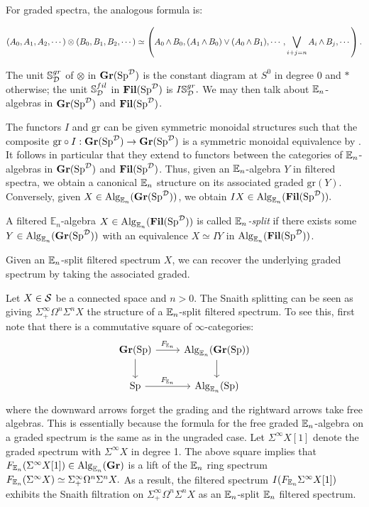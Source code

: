 For graded spectra, the analogous formula is:

$$(A_0,A_1,A_2,\cdots) \otimes (B_0,B_1,B_2,\cdots) \simeq \left( A_0 \smsh B_0, (A_1 \smsh B_0) \vee (A_0 \smsh B_1), \cdots, \bigvee_{i+j=n} A_i \smsh B_j, \cdots \right).$$


The unit $\mathbb{S}^{gr}_{\D}$ of $\otimes$ in $\Gr(\Sp^{\D})$ is the constant diagram at $S^0$ in degree 0 and $*$ otherwise; the unit $\mathbb{S}^{fil}_{\D}$ in $\Fil(\Sp^{\D})$ is $I\mathbb{S}^{gr}_{\D}.$  We may then talk about $\E_n$-algebras in $\Gr(\Sp^{\D})$ and $\Fil(\Sp^{\D})$.  


The functors $I$ and $\text{gr}$ can be given symmetric monoidal structures such that the composite $\text{gr}\circ I : \Gr(\Sp^{\D}) \to \Gr(\Sp^{\D})$ is a symmetric monoidal equivalence by \cite[Proposition 3.2.1]{LurieRot}.  It follows in particular that they extend to functors between the categories of $\E_n$-algebras in $\Gr(\Sp^{\D})$ and $\Fil(\Sp^{\D})$.  Thus, given an $\E_n$-algebra $Y$ in filtered spectra, we obtain a canonical $\E_n$ structure on its associated graded $\text{gr}(Y).$  Conversely, given $X\in \Alg_{\E_n}(\Gr(\Sp^{\D}))$, we obtain $IX\in \Alg_{\E_n}(\Fil(\Sp^{\D})).$  

\begin{dfn}
A filtered $\mathbb{E}_n$-algebra $X\in \Alg_{\E_n}(\Fil(\Sp^{\D}))$ is called \emph{$\E_n$-split} if there exists some $Y \in \Alg_{\E_n}(\Gr(\Sp^{\D}))$ with an equivalence $X \simeq IY$ in $\Alg_{\E_n}(\Fil(\Sp^{\D}))$.  
\end{dfn}

Given an $\E_n$-split filtered spectrum $X$, we can recover the underlying graded spectrum by taking the associated graded.  

\begin{exm}\label{exm:snaith}
Let $X\in \cS$ be a connected space and $n>0$.  The Snaith splitting can be seen as giving $\Sigma^{\infty}_+ \Omega^n \Sigma^n X$ the structure of a $\E_n$-split filtered spectrum.  To see this, first note that there is a commutative square of $\infty$-categories:
$$
\begin{tikzcd}
\Gr(\Sp) \arrow[d]\arrow[r,"F_{\E_n}"]&  \Alg_{\E_n}(\Gr(\Sp)) \arrow[d]\\
\Sp \arrow[r,"F_{\E_n}"] & \Alg_{\E_n}(\Sp) 
\end{tikzcd}
$$
where the downward arrows forget the grading and the rightward arrows take free algebras.  This is essentially because the formula for the free graded $\E_n$-algebra on a graded spectrum is the same as in the ungraded case.  Let $\Sigma^{\infty} X[1]$ denote the graded spectrum with $\Sigma^{\infty} X$ in degree 1.  The above square implies that $F_{\E_n}(\Sigma^{\infty} X[1] )\in \Alg_{\E_n}(\Gr)$ is a lift of the $\E_n$ ring spectrum $F_{\E_n}(\Sigma^{\infty} X) \simeq \Sigma^{\infty}_+ \Omega^n \Sigma^n X.$  As a result, the filtered spectrum $I(F_{\E_n} \Sigma^{\infty} X[1])$ exhibits the Snaith filtration on $\Sigma^{\infty}_+ \Omega^n \Sigma^n X$ as an $\E_n$-split $\E_n$ filtered spectrum.  
\end{exm}

